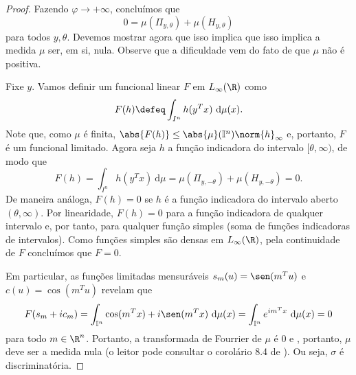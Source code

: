 \begin{proof}
    Fazendo \( \varphi \to +\infty \), concluímos que \[
        0 = \mu(\Pi_{ y, \theta }) + \mu(H_{ y, \theta })
    \]
    para todos \( y, \theta \).
    Devemos mostrar agora que isso implica que isso implica a medida \( \mu \) ser, em si, nula.
    Observe que a dificuldade vem do fato de que \( \mu \) não é positiva.

    Fixe \( y \).
    Vamos definir um funcional linear \( F \) em \( L_{ \infty }(\R) \) como \[
        F(h) \defeq \int_{ I^{ n } } h(y^{ T }x) \ \mathrm{d}\mu(x)
    .\]
    Note que, como \( \mu \) é finita, \( \abs{ F(h) } \leq \abs{ \mu }(\I^{ n }) \norm{ h }_{ \infty } \) e, portanto, \( F \) é um funcional limitado.
    Agora seja \( h \) a função indicadora do intervalo \( [\theta, \infty) \), de modo que \[
        F(h) = \int_{ I^{ n } } h(y^{ T }x) \ \mathrm{d}\mu
        = \mu(\Pi_{ y, -\theta }) + \mu(H_{ y, -\theta }) = 0
    .\]
    De maneira análoga, \( F(h) = 0 \) se \( h \) é a função indicadora do intervalo aberto \( (\theta, \infty) \).
    Por linearidade, \( F(h) = 0 \) para a função indicadora de qualquer intervalo e, por tanto, para qualquer função simples (soma de funções indicadoras de intervalos).
    Como funções simples são densas em \( L_{ \infty }(\R) \), pela continuidade de \( F \) concluímos que \( F = 0 \).

    Em particular, as funções limitadas mensuráveis \( s_{ m }(u) = \sen(m^{ T }u) \) e \( c(u) = \cos(m^{ T }u) \) revelam que \[
        F(s_{ m } + i c_{ m })
        = \int_{ \I^{ n } } \cos(m^{ T }x) + i \sen(m^{ T }x) \ \mathrm{d}\mu(x)
        = \int_{ \I^{ n } } e^{ i m^{ T }x } \ \mathrm{d}\mu(x)
        = 0
    \]
    para todo \( m \in \R^{ n } \).
    Portanto, a transformada de Fourrier de \( \mu \) é \( 0 \) e , portanto, \( \mu \) deve ser a medida nula (o leitor pode consultar o corolário 8.4 de \cite{fourier}).
    Ou seja, \( \sigma \) é discriminatória.
\end{proof}


